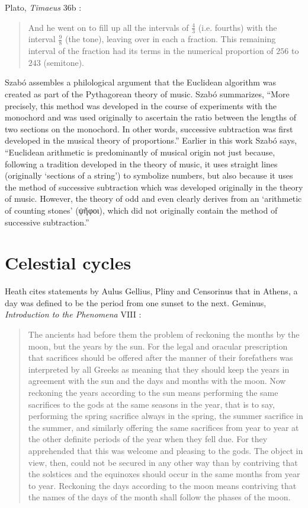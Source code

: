 \documentclass{article}
\begin{document}
Plato, {\em Timaeus} 36b \cite[pp.~71--72]{timaeus}:

\begin{quote}
And he went on to fill up all the intervals of $\frac{4}{3}$ (i.e. fourths) with the interval $\frac{9}{8}$ (the tone), leaving over in each a fraction.
This remaining interval of the fraction had its terms in the numerical proportion of $256$ to $243$ (semitone).
\end{quote}

Szab\'o \cite{szabo} assembles a philological argument that the Euclidean algorithm was created
as part of the Pythagorean theory of music. Szab\'o \cite[p.~136, Chapter 2.8]{szabo} summarizes, ``More precisely, 
this method was developed in the course of experiments with the monochord and was used originally to ascertain the ratio
between the lengths of two sections on the monochord. In other words, successive subtraction was first developed in the musical
theory of proportions.'' Earlier in this work Szab\'o \cite[pp.~28--29]{szabo} says, ``Euclidean arithmetic is predominantly of musical origin
not just because, following a tradition developed in the theory of music, it uses straight lines (originally `sections of a string') to symbolize numbers, but also because
it uses the method of successive subtraction which was developed originally in the theory of music. However, the theory of odd and even clearly derives from
an `arithmetic of counting stones' (ψῆφοι), which did not originally contain the method of successive subtraction.''





\section{Celestial cycles}
Heath \cite[p.~284]{aristarchus} cites statements by
Aulus Gellius, Pliny and Censorinus that in Athens, 
a day was defined to be the period from one sunset to the next.
Geminus, {\em Introduction to the Phenomena} VIII \cite[pp.~284--285]{aristarchus}:

\begin{quote}
The ancients had before them the problem
of reckoning the months by the moon, but the years by the sun. For the legal and
oracular prescription that sacrifices should be offered after the
manner of their forefathers was interpreted by all Greeks as meaning
that they should keep the years in agreement with the sun
and the days and months with the moon. Now reckoning the years
according to the sun means performing the same sacrifices to the
gods at the same seasons in the year, that is to say, performing
the spring sacrifice always in the spring, the summer sacrifice
in the summer, and similarly offering the same sacrifices from year
to year at the other definite periods of the year when they fell due.
For they apprehended that this was welcome and pleasing to the
gods. The object in view, then, could not be secured in any other
way than by contriving that the solstices and the equinoxes should
occur in the same months from year to year. Reckoning the days
according to the moon means contriving that the names of the
days of the month shall follow the phases of the moon.
\end{quote}
\end{document}
